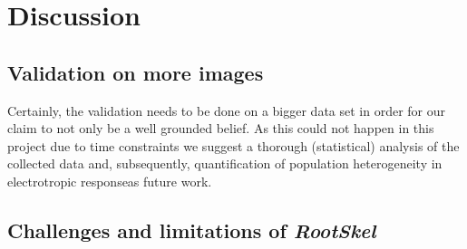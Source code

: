 
\chapter{Discussion} %

\label{discussion} %

%





\section{Validation on more images}

Certainly, the validation needs to be done on a bigger data set in order for our claim to not only be a well grounded belief.
As this could not happen in this project due to time constraints we suggest a thorough (statistical) analysis of the collected data and, subsequently, quantification of population heterogeneity in electrotropic responseas future work.


\section{Challenges and limitations of \textit{RootSkel}}



